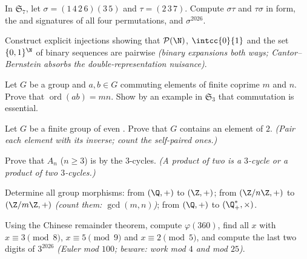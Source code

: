 \begin{exercise}[$\star$]\label{exo:b2:structures:2}
In $\mathfrak{S}_7$, let $\sigma = (1\,4\,2\,6)(3\,5)$ and $\tau =
(2\,3\,7)$. Compute $\sigma\tau$ and $\tau\sigma$ in 
form, the  and signatures of all four permutations, and
$\sigma^{2026}$.
\end{exercise}

\begin{exercise}[$\star$]\label{exo:b2:structures:3}
Construct explicit injections showing that $\mathcal{P}(\N)$,
$\intcc{0}{1}$ and the set $\{0,1\}^{\N}$ of binary sequences are
pairwise  \emph{(binary expansions both ways;
Cantor--Bernstein absorbs the double-representation nuisance)}.
\end{exercise}

\begin{exercise}[$\star$]\label{exo:b2:structures:4}
Let $G$ be a group and $a, b \in G$ commuting elements of finite
coprime  $m$ and $n$. Prove that $\operatorname{ord}(ab) =
mn$. Show by an example in $\mathfrak{S}_3$ that commutation is
essential.
\end{exercise}

\begin{exercise}[$\star\star$]\label{exo:b2:structures:5}
Let $G$ be a finite group of even . Prove that $G$ contains an
element of  $2$. \emph{(Pair each element with its inverse;
count the self-paired ones.)}
\end{exercise}

\begin{exercise}[$\star\star$]\label{exo:b2:structures:6}
Prove that $A_n$ ($n \geq 3$) is  by the $3$-cycles.
\emph{(A product of two  is a $3$-cycle or a product
of two $3$-cycles.)}
\end{exercise}

\begin{exercise}[$\star\star$]\label{exo:b2:structures:7}
Determine all group morphisms: from $(\Q, +)$ to $(\Z, +)$; from
$(\Z/n\Z, +)$ to $(\Z/m\Z, +)$ \emph{(count them:
$\gcd(m,n)$)}; from $(\Q, +)$ to $(\Q_+^*, \times)$.
\end{exercise}

\begin{exercise}[$\star\star$]\label{exo:b2:structures:8}
Using the Chinese remainder theorem, compute $\varphi(360)$, find
all $x$ with $x \equiv 3 \pmod 8$, $x \equiv 5 \pmod 9$ and $x
\equiv 2 \pmod 5$, and compute the last two digits of $3^{2026}$
\emph{(Euler mod $100$; beware: work mod $4$ and mod $25$)}.
\end{exercise}

